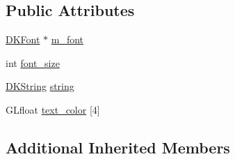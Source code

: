 \subsection*{Public Attributes}
\begin{DoxyCompactItemize}
\item 
\hyperlink{class_d_k_font}{D\-K\-Font} $\ast$ \hyperlink{class_d_k_text_a07f3bf26c1ac67bdb3f25eb022e1d9c7}{m\-\_\-font}
\item 
int \hyperlink{class_d_k_text_a207821292ef117eac869f47fd1b3fb99}{font\-\_\-size}
\item 
\hyperlink{_d_k_string_8h_ac168e8555ceba18e1a2919b21976bc84}{D\-K\-String} \hyperlink{class_d_k_text_ac5c21a7548ea7a1aad9eff22155e2583}{string}
\item 
G\-Lfloat \hyperlink{class_d_k_text_a454c177fe691d095f3a13f27bfcfc211}{text\-\_\-color} \mbox{[}4\mbox{]}
\end{DoxyCompactItemize}
\subsection*{Additional Inherited Members}


